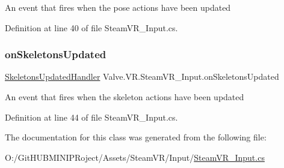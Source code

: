 An event that fires when the pose actions have been updated 



Definition at line 40 of file Steam\+V\+R\+\_\+\+Input.\+cs.

\mbox{\label{class_valve_1_1_v_r_1_1_steam_v_r___input_aca21226a9a9cd62d3039f0b378606a39}} 
\subsubsection{\texorpdfstring{onSkeletonsUpdated}{onSkeletonsUpdated}}
{\footnotesize\ttfamily \mbox{\hyperlink{class_valve_1_1_v_r_1_1_steam_v_r___input_a1880748ba2acc071a2a1e6eaa2ca2fd5}{Skeletons\+Updated\+Handler}} Valve.\+V\+R.\+Steam\+V\+R\+\_\+\+Input.\+on\+Skeletons\+Updated\hspace{0.3cm}{\ttfamily [static]}}



An event that fires when the skeleton actions have been updated 



Definition at line 44 of file Steam\+V\+R\+\_\+\+Input.\+cs.



The documentation for this class was generated from the following file\+:\begin{DoxyCompactItemize}
\item 
O\+:/\+Git\+H\+U\+B\+M\+I\+N\+I\+P\+Roject/\+Assets/\+Steam\+V\+R/\+Input/\mbox{\hyperlink{_steam_v_r___input_8cs}{Steam\+V\+R\+\_\+\+Input.\+cs}}\end{DoxyCompactItemize}
